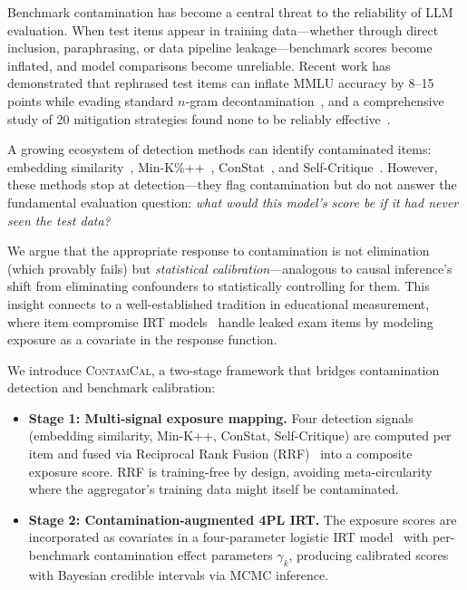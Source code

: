\documentclass[11pt,a4paper]{article}
\newcommand{\contamcal}{\textsc{ContamCal}}
\begin{document}
Benchmark contamination has become a central threat to the reliability of LLM evaluation. When test items appear in training data---whether through direct inclusion, paraphrasing, or data pipeline leakage---benchmark scores become inflated, and model comparisons become unreliable. Recent work has demonstrated that rephrased test items can inflate MMLU accuracy by 8--15 points while evading standard $n$-gram decontamination~\citep{yang2023rethinking}, and a comprehensive study of 20 mitigation strategies found none to be reliably effective~\citep{empcloths2025}.

A growing ecosystem of detection methods can identify contaminated items: embedding similarity~\citep{golchin2024time}, Min-K\%++~\citep{zhang2024minkpp}, ConStat~\citep{dekoninck2024constat}, and Self-Critique~\citep{weller2024selfcritique}. However, these methods stop at detection---they flag contamination but do not answer the fundamental evaluation question: \emph{what would this model's score be if it had never seen the test data?}

We argue that the appropriate response to contamination is not elimination (which provably fails) but \emph{statistical calibration}---analogous to causal inference's shift from eliminating confounders to statistically controlling for them. This insight connects to a well-established tradition in educational measurement, where item compromise IRT models~\citep{eckerly2017detecting, sinharay2017assessment} handle leaked exam items by modeling exposure as a covariate in the response function.

We introduce \contamcal{}, a two-stage framework that bridges contamination detection and benchmark calibration:

\begin{itemize}
\item \textbf{Stage 1: Multi-signal exposure mapping.} Four detection signals (embedding similarity, Min-K++, ConStat, Self-Critique) are computed per item and fused via Reciprocal Rank Fusion (RRF)~\citep{cormack2009reciprocal} into a composite exposure score. RRF is training-free by design, avoiding meta-circularity where the aggregator's training data might itself be contaminated.

\item \textbf{Stage 2: Contamination-augmented 4PL IRT.} The exposure scores are incorporated as covariates in a four-parameter logistic IRT model~\citep{deboeck2004explanatory} with per-benchmark contamination effect parameters $\gamma_k$, producing calibrated scores with Bayesian credible intervals via MCMC inference.
\end{itemize}
\end{document}
